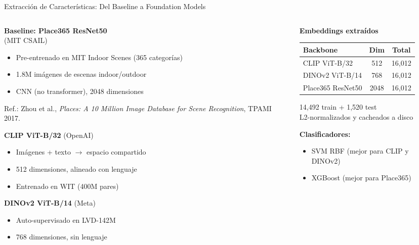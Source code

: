 \documentclass[aspectratio=169]{beamer}
\begin{document}
\begin{frame}{Extracci\'on de Caracter\'isticas: Del Baseline a Foundation Models}
\footnotesize
\begin{columns}
\begin{column}{0.48\textwidth}
\textbf{Baseline: Place365 ResNet50}\\
(MIT CSAIL)
\begin{itemize}
\item Pre-entrenado en MIT Indoor Scenes (365 categor\'ias)
\item 1.8M im\'agenes de escenas indoor/outdoor
\item CNN (no transformer), 2048 dimensiones
\end{itemize}
{\scriptsize\color{gray} Ref.: Zhou et al., \textit{Places: A 10 Million Image Database for Scene Recognition}, TPAMI 2017.}

\vspace{0.15cm}
\textbf{CLIP ViT-B/32} (OpenAI)
\begin{itemize}
\item Im\'agenes + texto $\rightarrow$ espacio compartido
\item 512 dimensiones, alineado con lenguaje
\item Entrenado en WIT (400M pares)
\end{itemize}

\vspace{0.15cm}
\textbf{DINOv2 ViT-B/14} (Meta)
\begin{itemize}
\item Auto-supervisado en LVD-142M
\item 768 dimensiones, sin lenguaje
\end{itemize}
\end{column}

\begin{column}{0.48\textwidth}
\textbf{Embeddings extra\'idos}
\begin{table}
\centering
\scriptsize
\begin{tabular}{@{}lcc@{}}
\toprule
\textbf{Backbone} & \textbf{Dim} & \textbf{Total} \\
\midrule
CLIP ViT-B/32 & 512 & 16,012 \\
DINOv2 ViT-B/14 & 768 & 16,012 \\
Place365 ResNet50 & 2048 & 16,012 \\
\bottomrule
\end{tabular}
\end{table}

\vspace{0.15cm}
\footnotesize 14,492 train + 1,520 test\\
L2-normalizados y cacheados a disco

\vspace{0.15cm}
\textbf{Clasificadores:}
\begin{itemize}
\item SVM RBF (mejor para CLIP y DINOv2)
\item XGBoost (mejor para Place365)
\end{itemize}
\end{column}
\end{columns}
\end{frame}
\end{document}
